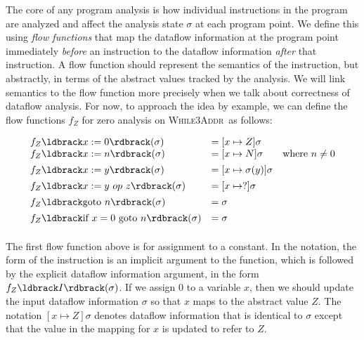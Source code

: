 \documentclass[11pt]{article}
\newcommand{\parg}[1] %
  {\ldbrack #1 \rdbrack}
\def\WhileThAddr{\textsc{While3Addr}}
\begin{document}
The core of any program analysis is how individual instructions in the program
are analyzed and affect the analysis state $\sigma$ at each program point. We
define this using \textit{flow functions} that map the dataflow information at
the program point immediately \emph{before} an instruction to the dataflow
information \emph{after} that instruction.  A flow function should represent the
semantics of the instruction, but abstractly, in terms of the abstract values
tracked by the analysis.  We will link semantics to the flow function more
precisely when we talk about correctness of dataflow analysis.  For now, to
approach the idea by example, we can define the flow functions $f_Z$ for zero
analysis on \WhileThAddr\ as follows:

\[
\begin{array}{lll}

f_Z\parg{x := 0}(\sigma) & = [x \mapsto Z]\sigma \\
f_Z\parg{x := n}(\sigma) & = [x \mapsto N]\sigma & \mbox{where}~ n \neq 0\\[1ex]

f_Z\parg{x := y}(\sigma) & = [x \mapsto \sigma(y)]\sigma\\[1ex]

f_Z\parg{x := y ~op~ z}(\sigma) & = [x \mapsto ?]\sigma\\[1ex]

f_Z\parg{\mbox{goto}~n}(\sigma) & = \sigma\\[1ex]

f_Z\parg{\mbox{if}~x=0~\mbox{goto}~n}(\sigma) & = \sigma\\[1ex]

\end{array}
\]

The first flow function above is for assignment to a constant.  In the notation,
the form of the instruction is an implicit argument to the function, which is
followed by the explicit dataflow information argument, in the form
$f_Z\parg{I}(\sigma)$. If we assign 0 to a variable $x$, then we should update
the input dataflow information $\sigma$ so that $x$ maps to the abstract value
$Z$.  The notation $[x \mapsto Z]\sigma$ denotes dataflow information that is
identical to $\sigma$ except that the value in the mapping for $x$ is updated to
refer to $Z$.
\end{document}
